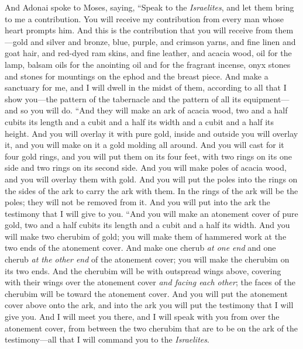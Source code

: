 \begin{biblechapter} %
 And Adonai spoke to Moses, saying,
\verse “Speak to the \textit{Israelites}, and let them bring to me a contribution. You will receive my contribution from every man whose heart prompts him.
\verse And this is the contribution that you will receive from them—gold and silver and bronze,
\verse blue, purple, and crimson yarns, and fine linen and goat hair,
\verse and red-dyed ram skins, and fine leather, and acacia wood,
\verse oil for the lamp, balsam oils for the anointing oil and for the fragrant incense,
\verse onyx stones and stones for mountings on the ephod and the breast piece.
\verse And make a sanctuary for me, and I will dwell in the midst of them,
\verse according to all that I show you—the pattern of the tabernacle and the pattern of all its equipment—and so you will do.
 “And they will make an ark of acacia wood, two and a half cubits its length and a cubit and a half its width and a cubit and a half its height.
\verse And you will overlay it with pure gold, inside and outside you will overlay it, and you will make on it a gold molding all around.
\verse And you will cast for it four gold rings, and you will put them on its four feet, with two rings on its one side and two rings on its second side.
\verse And you will make poles of acacia wood, and you will overlay them with gold.
\verse And you will put the poles into the rings on the sides of the ark to carry the ark with them.
\verse In the rings of the ark will be the poles; they will not be removed from it.
\verse And you will put into the ark the testimony that I will give to you.
\verse “And you will make an atonement cover of pure gold, two and a half cubits its length and a cubit and a half its width.
\verse And you will make two cherubim of gold; you will make them of hammered work at the two ends of the atonement cover.
\verse And make one cherub \textit{at one end} and one cherub \textit{at the other end} of the atonement cover; you will make the cherubim on its two ends.
\verse And the cherubim will be with outspread wings above, covering with their wings over the atonement cover \textit{and facing each other}; the faces of the cherubim will be toward the atonement cover.
\verse And you will put the atonement cover above onto the ark, and into the ark you will put the testimony that I will give you.
\verse And I will meet you there, and I will speak with you from over the atonement cover, from between the two cherubim that are to be on the ark of the testimony—all that I will command you to the \textit{Israelites}.

\end{biblechapter}
